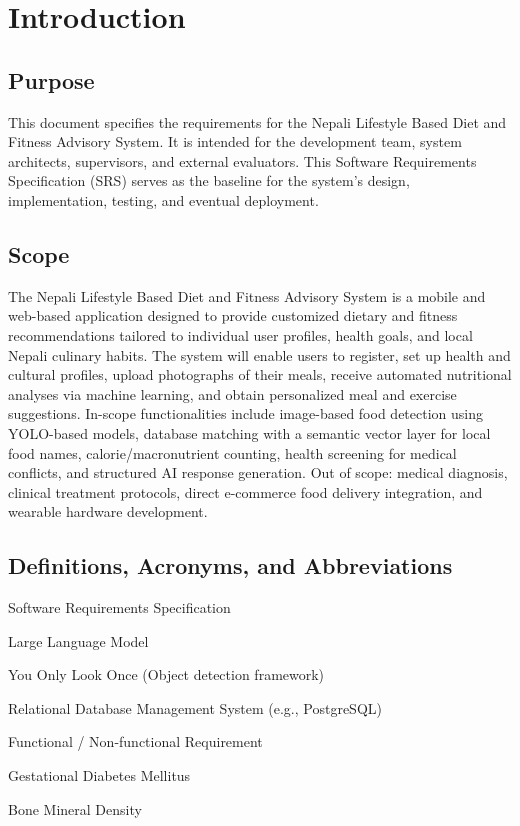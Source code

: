 \documentclass[11pt,a4paper]{article}
\newcommand{\projecttitle}{Nepali Lifestyle Based Diet and Fitness Advisory System}   %
\begin{document}
\clearpage
\tableofcontents
\clearpage

\section{Introduction}

\subsection{Purpose}
This document specifies the requirements for the \projecttitle{}. It is intended for the development team, system architects, supervisors, and external evaluators. This Software Requirements Specification (SRS) serves as the baseline for the system's design, implementation, testing, and eventual deployment.

\subsection{Scope}
The \projecttitle{} is a mobile and web-based application designed to provide customized dietary and fitness recommendations tailored to individual user profiles, health goals, and local Nepali culinary habits. The system will enable users to register, set up health and cultural profiles, upload photographs of their meals, receive automated nutritional analyses via machine learning, and obtain personalized meal and exercise suggestions. In-scope functionalities include image-based food detection using YOLO-based models, database matching with a semantic vector layer for local food names, calorie/macronutrient counting, health screening for medical conflicts, and structured AI response generation. Out of scope: medical diagnosis, clinical treatment protocols, direct e-commerce food delivery integration, and wearable hardware development.

\subsection{Definitions, Acronyms, and Abbreviations}
\begin{description}[leftmargin=2.5cm,style=nextline]
  \item[SRS] Software Requirements Specification
  \item[LLM] Large Language Model
  \item[YOLO] You Only Look Once (Object detection framework)
  \item[RDBMS] Relational Database Management System (e.g., PostgreSQL)
  \item[FR / NFR] Functional / Non-functional Requirement
  \item[GDM] Gestational Diabetes Mellitus
  \item[BMD] Bone Mineral Density
\end{description}
\end{document}
